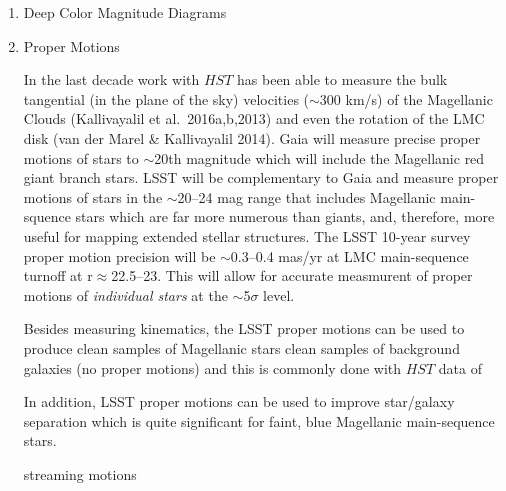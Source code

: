 \begin{enumerate}

\item Deep Color Magnitude Diagrams


\item Proper Motions

In the last decade work with $HST$ has been able to measure the bulk
tangential (in the plane of the sky) velocities ($\sim$300 km/s) of
the Magellanic Clouds (Kallivayalil et al.\ 2016a,b,2013) and even the
rotation of the LMC disk (van der Marel \& Kallivayalil 2014). Gaia
will measure precise proper motions of stars to $\sim$20th magnitude
which will include the Magellanic red giant branch stars. LSST will be
complementary to Gaia and measure proper motions of stars in the
$\sim$20--24 mag range that includes Magellanic main-squence stars
which are far more numerous than giants, and, therefore, more useful
for mapping extended stellar structures. The LSST 10-year survey
proper motion precision will be $\sim$0.3--0.4 mas/yr at LMC
main-sequence turnoff at r$\approx$22.5--23.  This will allow for
accurate measmurent of proper motions of {\em individual stars} at the
$\sim$5$\sigma$ level.

Besides measuring kinematics, the LSST proper motions can be used to
produce clean samples of Magellanic stars clean samples of background
galaxies (no proper motions) and this is commonly done with $HST$ data
of

In addition, LSST proper motions can be used to improve star/galaxy
separation which is quite significant for faint, blue Magellanic
main-sequence stars.

streaming motions

%
%




\end{enumerate}
